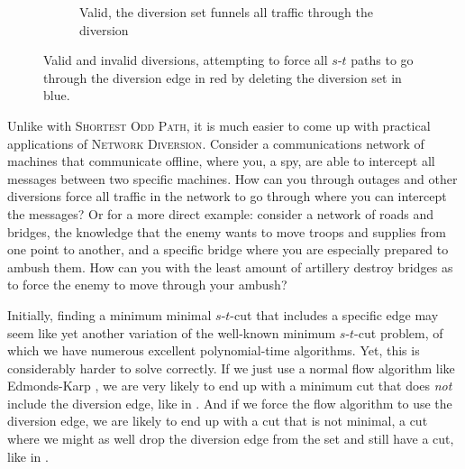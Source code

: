 \begin{figure}[H]
\begin{subfigure}{.3\textwidth}
        \caption{Valid, the diversion set funnels all traffic through the diversion}
        \label{subfigure:valid-diversion}
    \end{subfigure}
    \caption{Valid and invalid diversions, attempting to force all $s$-$t$ paths to go through the diversion edge in red by deleting the diversion set in blue.}
    \label{figure:diversion-attempts}
\end{figure}

Unlike with \textsc{Shortest Odd Path}, it is much easier to come up with practical applications of \textsc{Network Diversion}. Consider a communications network of machines that communicate offline, where you, a spy, are able to intercept all messages between two specific machines. How can you through outages and other diversions force all traffic in the network to go through where you can intercept the messages? Or for a more direct example: consider a network of roads and bridges, the knowledge that the enemy wants to move troops and supplies from one point to another, and a specific bridge where you are especially prepared to ambush them. How can you with the least amount of artillery destroy bridges as to force the enemy to move through your ambush?

Initially, finding a minimum minimal $s$-$t$-cut that includes a specific edge may seem like yet another variation of the well-known minimum $s$-$t$-cut problem, of which we have numerous excellent polynomial-time algorithms. Yet, this is considerably harder to solve correctly. If we just use a normal flow algorithm like Edmonds-Karp \cite{source:edmonds-karp-algorithn}, we are very likely to end up with a minimum cut that does \emph{not} include the diversion edge, like in . And if we force the flow algorithm to use the diversion edge, we are likely to end up with a cut that is not minimal, a cut where we might as well drop the diversion edge from the set and still have a cut, like in .

